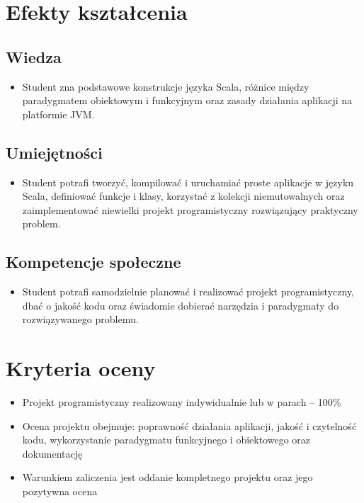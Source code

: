 \documentclass[12pt, a4paper]{article}
\begin{document}
\section{Efekty kształcenia}

\subsection*{Wiedza}
\begin{itemize}
  \item Student zna podstawowe konstrukcje języka Scala, różnice między paradygmatem obiektowym i funkcyjnym oraz zasady działania aplikacji na platformie JVM.
\end{itemize}

\subsection*{Umiejętności}
\begin{itemize}
  \item Student potrafi tworzyć, kompilować i uruchamiać proste aplikacje w języku Scala, definiować funkcje i klasy, korzystać z kolekcji niemutowalnych oraz zaimplementować niewielki projekt programistyczny rozwiązujący praktyczny problem.
\end{itemize}

\subsection*{Kompetencje społeczne}
\begin{itemize}
  \item Student potrafi samodzielnie planować i realizować projekt programistyczny, dbać o jakość kodu oraz świadomie dobierać narzędzia i paradygmaty do rozwiązywanego problemu.
\end{itemize}

\section{Kryteria oceny}

\begin{itemize}
  \item Projekt programistyczny realizowany indywidualnie lub w parach – 100\%
  \item Ocena projektu obejmuje: poprawność działania aplikacji, jakość i czytelność kodu, wykorzystanie paradygmatu funkcyjnego i obiektowego oraz dokumentację
  \item Warunkiem zaliczenia jest oddanie kompletnego projektu oraz jego pozytywna ocena
\end{itemize}
\end{document}
